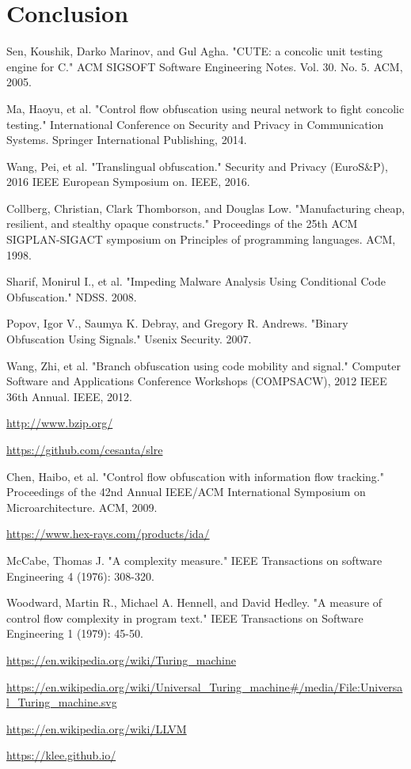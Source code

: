 \documentclass[lnicst]{svmultln}
\begin{document}
\section{Conclusion}
 

%
%
\begin{thebibliography}{5}

 Sen, Koushik, Darko Marinov, and Gul Agha. "CUTE: a concolic unit testing engine for C." ACM SIGSOFT Software Engineering Notes. Vol. 30. No. 5. ACM, 2005.

 Ma, Haoyu, et al. "Control flow obfuscation using neural network to fight concolic testing." International Conference on Security and Privacy in Communication Systems. Springer International Publishing, 2014.

 Wang, Pei, et al. "Translingual obfuscation." Security and Privacy (EuroS\&P), 2016 IEEE European Symposium on. IEEE, 2016.

 Collberg, Christian, Clark Thomborson, and Douglas Low. "Manufacturing cheap, resilient, and stealthy opaque constructs." Proceedings of the 25th ACM SIGPLAN-SIGACT symposium on Principles of programming languages. ACM, 1998.

 Sharif, Monirul I., et al. "Impeding Malware Analysis Using Conditional Code Obfuscation." NDSS. 2008.

 Popov, Igor V., Saumya K. Debray, and Gregory R. Andrews. "Binary Obfuscation Using Signals." Usenix Security. 2007.

 Wang, Zhi, et al. "Branch obfuscation using code mobility and signal." Computer Software and Applications Conference Workshops (COMPSACW), 2012 IEEE 36th Annual. IEEE, 2012.

 \url{http://www.bzip.org/}

 \url{https://github.com/cesanta/slre}

 Chen, Haibo, et al. "Control flow obfuscation with information flow tracking." Proceedings of the 42nd Annual IEEE/ACM International Symposium on Microarchitecture. ACM, 2009.

 \url{https://www.hex-rays.com/products/ida/}

 McCabe, Thomas J. "A complexity measure." IEEE Transactions on software Engineering 4 (1976): 308-320.

 Woodward, Martin R., Michael A. Hennell, and David Hedley. "A measure of control flow complexity in program text." IEEE Transactions on Software Engineering 1 (1979): 45-50.

 \url{https://en.wikipedia.org/wiki/Turing_machine}

 \url{https://en.wikipedia.org/wiki/Universal_Turing_machine#/media/File:Universal_Turing_machine.svg}

 \url{https://en.wikipedia.org/wiki/LLVM}

 \url{https://klee.github.io/}


\end{thebibliography}
%
\end{document}
